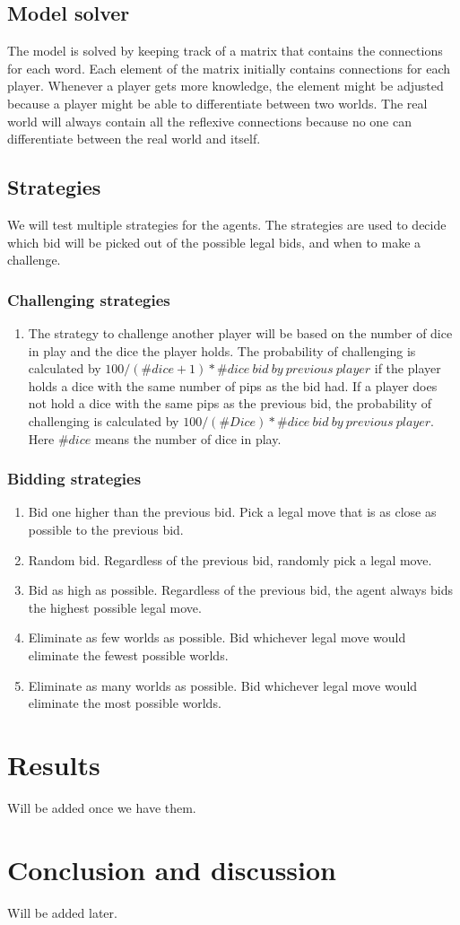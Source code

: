 \documentclass{article}
\begin{document}
\subsection*{Model solver}%
The model is solved by keeping track of a matrix that contains the connections for each word. Each element of the matrix initially contains connections for each player. Whenever a player gets more knowledge, the element might be adjusted because a player might be able to differentiate between two worlds. The real world will always contain all the reflexive connections because no one can differentiate between the real world and itself. 
\subsection*{Strategies} %
We will test multiple strategies for the agents. The strategies are used to decide which bid will be picked out of the possible legal bids, and when to make a challenge.
\subsubsection*{Challenging strategies}
\begin{enumerate}
    \item The strategy to challenge another player will be based on the number of dice in play and the dice the player holds. The probability of challenging is calculated by $100/(\#dice+1) * \#dice\ bid\ by\ previous\ player$ if the player holds a dice with the same number of pips as the bid had. If a player does not hold a dice with the same pips as the previous bid, the probability of challenging is calculated by $100/(\#Dice) * \#dice\ bid\ by\ previous\ player$. Here $\#dice$ means the number of dice in play.
\end{enumerate}
\subsubsection*{Bidding strategies}
\begin{enumerate}
    \item Bid one higher than the previous bid. Pick a legal move that is as close as possible to the previous bid.
    \item Random bid. Regardless of the previous bid, randomly pick a legal move.
    \item Bid as high as possible. Regardless of the previous bid, the agent always bids the highest possible legal move.
    \item Eliminate as few worlds as possible. Bid whichever legal move would eliminate the fewest possible worlds.
    \item Eliminate as many worlds as possible. Bid whichever legal move would eliminate the most possible worlds.
\end{enumerate}


\section*{Results}
Will be added once we have them.
\section*{Conclusion and discussion}
Will be added later.

%
\end{document}

